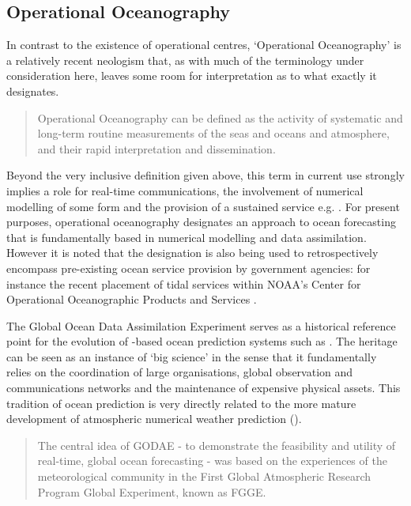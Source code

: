 \subsection{Operational Oceanography}
\label{S:operational_oceanography}


In contrast to the existence of operational centres, `Operational Oceanography' is a relatively recent neologism that, as with much of the terminology under consideration here, leaves some room for interpretation as to what exactly it designates.
\begin{quote}
Operational Oceanography can be defined as the activity of systematic and long-term routine measurements of the seas and oceans and atmosphere, and their rapid interpretation and dissemination.\citep{EuroGOOS:ws}
\end{quote}
Beyond the very inclusive definition given above, this term in current use strongly implies a role for real-time communications, the involvement of numerical modelling of some form and the provision of a sustained service e.g. \citep{Flather:2000ju}.   For present purposes, operational oceanography designates an approach to ocean forecasting that is fundamentally based in numerical modelling and data assimilation.  However it is noted that the designation is also being used to retrospectively encompass pre-existing ocean service provision by government agencies: for instance the recent placement of tidal services within NOAA's Center for Operational Oceanographic Products and Services \citep{NOAA:wv}.




The Global Ocean Data Assimilation Experiment \GODAE{} \citep{Bell:2009uv} serves as a historical reference point for the evolution of \OGCM{}-based ocean prediction systems such as \BL{}.  The \GODAE{} heritage can be seen as an instance of `big science' \citep{Petersen:2012tr} in the sense that it fundamentally relies on the coordination of large organisations, global observation and communications networks and the maintenance of expensive physical assets.   This tradition of ocean prediction is very directly related to the more mature development of atmospheric numerical weather prediction (\NWP).  
\begin{quote}
The central idea of GODAE - to demonstrate the feasibility and utility of real-time, global ocean forecasting - was based on the experiences of the meteorological community in the First Global Atmospheric Research Program Global Experiment, known as FGGE. \citep{Bell:2009uv}
\end{quote}




